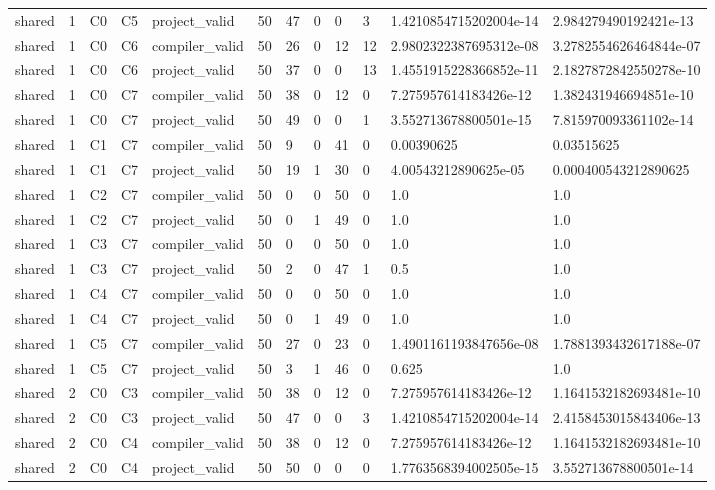 \begin{tabular}{llllllllllll}
shared & 1 & C0 & C5 & project\_valid & 50 & 47 & 0 & 0 & 3 & 1.4210854715202004e-14 & 2.984279490192421e-13 \\
shared & 1 & C0 & C6 & compiler\_valid & 50 & 26 & 0 & 12 & 12 & 2.9802322387695312e-08 & 3.2782554626464844e-07 \\
shared & 1 & C0 & C6 & project\_valid & 50 & 37 & 0 & 0 & 13 & 1.4551915228366852e-11 & 2.1827872842550278e-10 \\
shared & 1 & C0 & C7 & compiler\_valid & 50 & 38 & 0 & 12 & 0 & 7.275957614183426e-12 & 1.382431946694851e-10 \\
shared & 1 & C0 & C7 & project\_valid & 50 & 49 & 0 & 0 & 1 & 3.552713678800501e-15 & 7.815970093361102e-14 \\
shared & 1 & C1 & C7 & compiler\_valid & 50 & 9 & 0 & 41 & 0 & 0.00390625 & 0.03515625 \\
shared & 1 & C1 & C7 & project\_valid & 50 & 19 & 1 & 30 & 0 & 4.00543212890625e-05 & 0.000400543212890625 \\
shared & 1 & C2 & C7 & compiler\_valid & 50 & 0 & 0 & 50 & 0 & 1.0 & 1.0 \\
shared & 1 & C2 & C7 & project\_valid & 50 & 0 & 1 & 49 & 0 & 1.0 & 1.0 \\
shared & 1 & C3 & C7 & compiler\_valid & 50 & 0 & 0 & 50 & 0 & 1.0 & 1.0 \\
shared & 1 & C3 & C7 & project\_valid & 50 & 2 & 0 & 47 & 1 & 0.5 & 1.0 \\
shared & 1 & C4 & C7 & compiler\_valid & 50 & 0 & 0 & 50 & 0 & 1.0 & 1.0 \\
shared & 1 & C4 & C7 & project\_valid & 50 & 0 & 1 & 49 & 0 & 1.0 & 1.0 \\
shared & 1 & C5 & C7 & compiler\_valid & 50 & 27 & 0 & 23 & 0 & 1.4901161193847656e-08 & 1.7881393432617188e-07 \\
shared & 1 & C5 & C7 & project\_valid & 50 & 3 & 1 & 46 & 0 & 0.625 & 1.0 \\
shared & 2 & C0 & C3 & compiler\_valid & 50 & 38 & 0 & 12 & 0 & 7.275957614183426e-12 & 1.1641532182693481e-10 \\
shared & 2 & C0 & C3 & project\_valid & 50 & 47 & 0 & 0 & 3 & 1.4210854715202004e-14 & 2.4158453015843406e-13 \\
shared & 2 & C0 & C4 & compiler\_valid & 50 & 38 & 0 & 12 & 0 & 7.275957614183426e-12 & 1.1641532182693481e-10 \\
shared & 2 & C0 & C4 & project\_valid & 50 & 50 & 0 & 0 & 0 & 1.7763568394002505e-15 & 3.552713678800501e-14 \\

\end{tabular}
